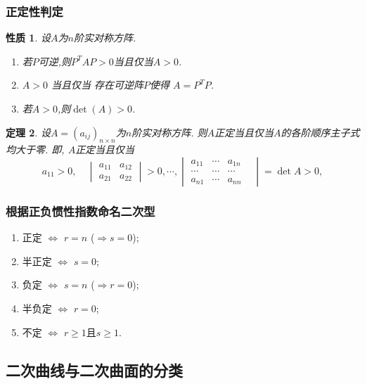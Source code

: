 \documentclass{article}
\newtheorem{theorem}{定理}  %
\newtheorem{proposition}[theorem]{性质}  %
\renewcommand{\blue }[1]{{\textcolor[rgb]{0,0,1}{#1}}}
\begin{document}
\subsubsection{正定性判定}
\begin{proposition}
设$A$为$n$阶实对称方阵.
\begin{enumerate}
\item 若$P$可逆,则$P^TAP>0$当且仅当$A>0$.\qquad \blue{相合不变性}
\item $A>0$ 当且仅当 存在可逆阵$P$使得 $A=P^TP$. \quad\blue{相合标准形}
\item 若$A>0$,则$\det(A)>0$.
\end{enumerate}
\end{proposition}
\begin{theorem}
设$A=(a_{ij})_{n\times n}$为$n$阶实对称方阵.
则$A$正定当且仅当$A$的各阶顺序主子式均大于零.
即, $A$正定当且仅当
\[a_{11}>0,\quad \begin{vmatrix}a_{11}&a_{12}\\a_{21}&a_{22}\end{vmatrix}>0,\cdots,\begin{vmatrix}a_{11}&\cdots&a_{1n}\\\cdots&\cdots&\cdots&\\a_{n1}&\cdots&a_{nn}\end{vmatrix}=\det{A}>0,\]
\end{theorem}

\subsubsection{根据正负惯性指数命名二次型}
\begin{enumerate}
\item 正\quad 定 $\Leftrightarrow$ $r=n$ ($\Rightarrow s=0$);
\item 半正定 $\Leftrightarrow$ $s=0$;
\item 负\quad 定 $\Leftrightarrow$ $s=n$ ($\Rightarrow r=0$);
\item 半负定 $\Leftrightarrow$ $r=0$;
\item 不\quad 定 $\Leftrightarrow$ $r\geq1$且$s\geq1$.
\end{enumerate}


\subsection{二次曲线与二次曲面的分类}
\end{document}
